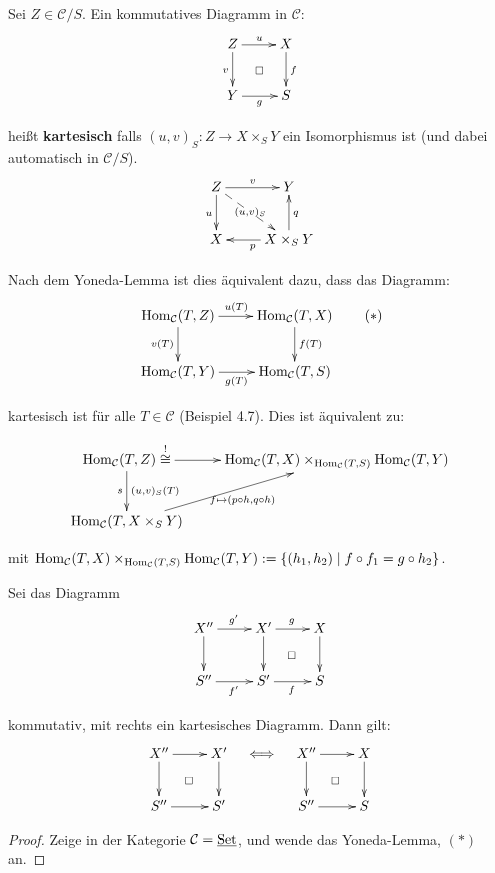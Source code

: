 Sei $Z\in\mathcal{C}/S$. Ein kommutatives Diagramm in $\mathcal{C}$:
\[
  \xymatrix{Z\ar[r]^{u}\ar[d]_{v}\ar@{}[dr]|{\square} & X\ar[d]^{f}\\
    Y\ar[r]_{g} & S
  }
\]

heißt \textbf{kartesisch} falls $(u,v)_{S}:Z\rightarrow X\times_{S}Y$
ein Isomorphismus ist (und dabei automatisch in $\mathcal{C}/S$).
\[
  \xymatrix{Z\ar[d]_{u}\ar@{-->}[rd]|-{(u,v)_{S}}\ar[r]^{v} & Y\\
    X & X\times_{S}Y\ar[l]^{p}\ar[u]_{q}
  }
\]

\begin{rem}
Nach dem Yoneda-Lemma ist dies äquivalent dazu, dass das Diagramm:
\[
  \xymatrix{\Hom_{\mathcal{C}}(T,Z)\ar[r]^{u(T)}\ar[d]_{v(T)} & \Hom_{\mathcal{C}}(T,X)\ar[d]^{f(T)}\\
    \Hom_{\mathcal{C}}(T,Y)\ar[r]_{g(T)} & \Hom_{\mathcal{C}}(T,S)
  }
  \qquad(*)
\]

kartesisch ist für alle $T\in\mathcal{C}$ (Beispiel 4.7). Dies ist
äquivalent zu: %
\begin{comment}
  Pfeile klappen hier nicht besonders gut, evt. Isomorphismus $\Hom_{\mathcal{C}}(T,Z)\rightarrow\cdots$
  benennen.
\end{comment}
\[
  \xymatrix{\Hom_{\mathcal{C}}(T,Z)\overset{!}{\cong}\ar[r]\ar[d]_{s}^{(u,v)_{S}(T)} & \Hom_{\mathcal{C}}(T,X)\times_{\Hom_{\mathcal{C}}(T,S)}\Hom_{\mathcal{C}}(T,Y)\\
    \Hom_{\mathcal{C}}(T,X\times_{S}Y)\ar[ur]_{f\mapsto(p\circ h,q\circ h)}
  }
\]

mit $\operatorname{\mathrm{Hom}}_{\mathcal{C}}(T,X)\times_{\operatorname{\mathrm{Hom}}_{\mathcal{C}}(T,S)}\operatorname{\mathrm{Hom}}_{\mathcal{C}}(T,Y):=\{(h_{1},h_{2})\mid f\circ f_{1}=g\circ h_{2}\}$.
\begin{comment}
  Hier ist noch ein weiteres Diagramm, mit sich kreuzenden Pfeilen.
\end{comment}
\end{rem}

\begin{prop}[10]
  Sei das Diagramm
  \[
    \xymatrix{X''\ar[r]^{g'}\ar[d] & X'\ar[r]^{g}\ar[d]\ar@{}[dr]|{\square} & X\ar[d]\\
      S''\ar[r]_{f'} & S'\ar[r]_{f} & S
    }
  \]

  kommutativ, mit rechts ein kartesisches Diagramm. Dann gilt:
  \[
    \xymatrix{X''\ar[r]\ar[d]\ar@{}[dr]|{\square} & X'\ar[d]\\
      S''\ar[r] & S'
    }
    \quad\Longleftrightarrow\quad\xymatrix{X''\ar[r]\ar[d]\ar@{}[dr]|{\square} & X\ar[d]\\
      S''\ar[r] & S
    }
  \]
\end{prop}

\begin{proof}
  Zeige in der Kategorie $\mathcal{C}=\operatorname{\underline{Set}}$, und wende das Yoneda-Lemma,
  $(*)$ an.
\end{proof}
